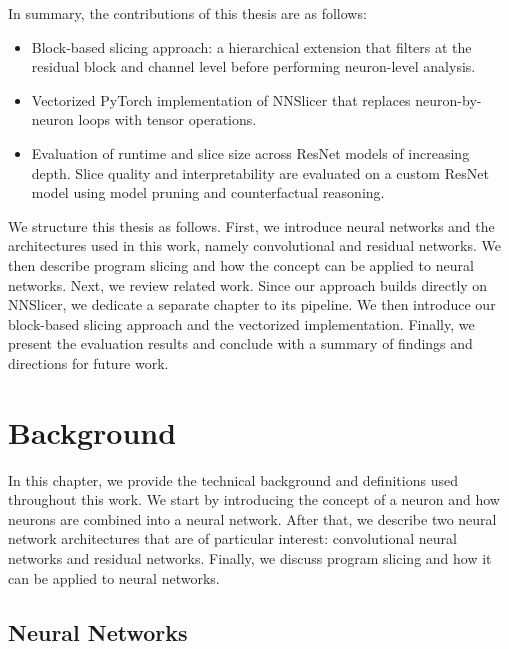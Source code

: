 \documentclass[
12pt,
fancyheadings,
a4paper,
twoside,
BCOR=0.7cm,
nobcorignoretitle,
grayscalebody,
]{stsreprt}
\begin{document}
In summary, the contributions of this thesis are as follows:
\begin{itemize}
  \item Block-based slicing approach: a hierarchical extension that filters at the residual block and channel level before performing neuron-level analysis.
  \item Vectorized PyTorch implementation of NNSlicer that replaces neuron-by-neuron loops with tensor operations.
  \item Evaluation of runtime and slice size across ResNet models of increasing depth. Slice quality and interpretability are evaluated on a custom ResNet model using model pruning and counterfactual reasoning.
\end{itemize}

\vspace{0.2cm}
We structure this thesis as follows.
First, we introduce neural networks and the architectures used in this work, namely convolutional
and residual networks.
We then describe program slicing and how the concept can be applied to neural networks.
Next, we review related work. Since our approach builds directly on NNSlicer, we dedicate a
separate chapter to its pipeline.
We then introduce our block-based slicing approach and the vectorized implementation.
Finally, we present the evaluation results and conclude with a summary of findings and directions
for future work.



\chapter{Background}
\label{chap:background}

In this chapter, we provide the technical background and definitions used throughout this work.
We start by introducing the concept of a neuron and how neurons are combined into a neural network.
After that, we describe two neural network architectures that are of particular interest:
convolutional neural networks and residual networks.
Finally, we discuss program slicing and how it can be applied to neural networks.

\section{Neural Networks}
\label{sec:neural_networks}
\end{document}
